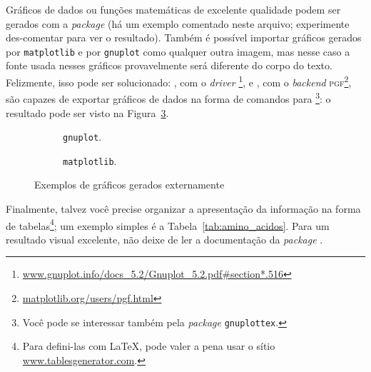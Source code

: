 Gráficos de dados ou funções matemáticas de excelente qualidade podem ser
gerados com a \textit{package}  (há um exemplo comentado neste
arquivo; experimente des-comentar para ver o resultado). Também é possível
importar gráficos gerados por \texttt{matplotlib} e por \texttt{gnuplot}
como qualquer outra imagem, mas nesse caso a fonte usada nesses gráficos
provavelmente será diferente do corpo do texto. Felizmente, isso pode ser
solucionado: , com o \emph{driver} \footnote{
\url{www.gnuplot.info/docs\_5.2/Gnuplot\_5.2.pdf\#section*.516}}, e
, com o \emph{backend} \textsc{pgf}\footnote{
\url{matplotlib.org/users/pgf.html}}, são capazes de exportar gráficos de
dados na forma de comandos para \footnote{Você pode se interessar
também pela \textit{package} \texttt{gnuplottex}.}: o resultado pode ser
visto na Figura~\ref{fig:graficos}.

\begin{figure}
  \centering
  \begin{subfigure}[b]{.45\textwidth}
    \caption{\texttt{gnuplot}.\label{fig:gnuplot}}
  \end{subfigure}
  \begin{subfigure}[b]{.5\textwidth}
    
    \caption{\texttt{matplotlib}.\label{fig:matplotlib}}
  \end{subfigure}
  \caption{Exemplos de gráficos gerados externamente}\label{fig:graficos}
\end{figure}

Finalmente, talvez você precise organizar a apresentação da informação na forma de
tabelas\footnote{Para defini-las com \LaTeX{}, pode valer a pena usar o
sítio \url{www.tablesgenerator.com}.}; um exemplo simples é a Tabela~\ref{tab:amino_acidos}.
Para um resultado visual excelente, não deixe de ler a documentação da
\emph{package} .


